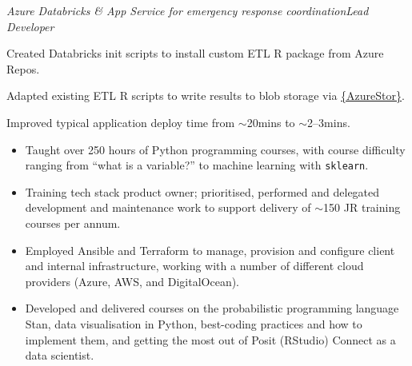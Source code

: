 \documentclass[12pt, a4paper]{article}
\begin{document}
%
       {\emph{Azure Databricks \& App Service for emergency response
           coordination\hfill{}Lead Developer}

       \begin{adjustwidth}{0em}{3em}

       Created Databricks init scripts to install custom ETL R package from Azure
       Repos.

       Adapted existing ETL R scripts to write results to blob storage via
       \href{https://cran.r-project.org/web/packages/AzureStor/vignettes/intro.html}%
            {\{AzureStor\}}.

       Improved typical application deploy time from $\sim$20mins to $\sim$2--3mins.

       \end{adjustwidth}}%

\vspace{-.4em}


\begin{itemize}[
    itemsep=.2em,
    labelwidth=2em,
    leftmargin=3.25em,
    topsep=0em]

     \item[\faIcon{python}]%
       {Taught over 250 hours of Python programming courses, with course difficulty
        ranging from ``what is a variable?'' to machine learning with \texttt{sklearn}.}%

     \item[\faIcon{layer-group}]%
       {Training tech stack product owner; prioritised, performed and delegated development and
       maintenance work to support delivery of $\sim$150 JR training courses per
       annum.}

    \item[\faIcon{cloud}]%
       {Employed Ansible and Terraform to manage, provision and configure client and
        internal infrastructure, working with a number of different cloud
        providers (Azure, AWS, and DigitalOcean).}%

     \item[\faIcon{chalkboard-teacher}]%
       {Developed and delivered courses on the probabilistic programming
        language Stan, data visualisation in Python, best-coding practices and how to
        implement them, and getting the most out of Posit (RStudio) Connect as a data
        scientist.}%

\end{itemize}
\end{document}
